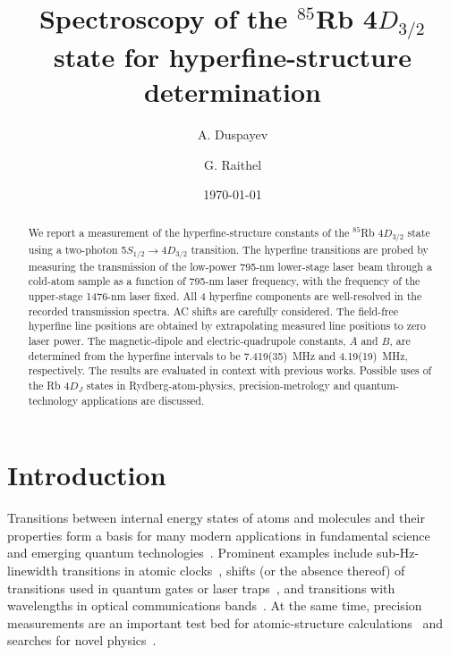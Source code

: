 \documentclass[reprint, amsmath,amssymb, aps, pra, longbibliography]{revtex4-1}
\begin{document}
\title{Spectroscopy of the $^{85}$Rb 4$D_{3/2}$ state for hyperfine-structure determination}
\date{\today }

\author{A. Duspayev}
\author{G. Raithel}


\begin{abstract}
We report a measurement of the hyperfine-structure constants of the $^{85}$Rb 4$D_{3/2}$ state using a two-photon 5$S_{1/2}\rightarrow$4$D_{3/2}$ transition. The hyperfine transitions are probed by measuring the transmission of the low-power 795-nm lower-stage laser beam through a cold-atom sample as a function of 795-nm laser frequency, with the frequency of the upper-stage 1476-nm laser fixed. All 4 hyperfine components are well-resolved in the recorded transmission spectra. AC shifts are carefully considered. The field-free hyperfine line positions are obtained by extrapolating measured line positions to zero laser power. 
The magnetic-dipole and electric-quadrupole constants, $A$ and $B$, are determined from the hyperfine intervals to be 7.419(35)~MHz and 4.19(19)~MHz, respectively.
The results are evaluated in context with previous works. Possible uses of the Rb 4$D_J$ states in Rydberg-atom-physics, precision-metrology and quantum-technology applications are discussed.   
\end{abstract}



\maketitle


\section{Introduction}
\label{sec:intro}
Transitions between internal energy states of atoms and molecules and their properties form a basis for many modern applications in fundamental science~\cite{safronovarmp} and emerging quantum technologies~\cite{macfarlane, Adams_2020, weiss2017}. Prominent examples include sub-Hz-linewidth transitions in atomic clocks~\cite{bloom2014}, shifts (or the absence thereof) of transitions used in quantum gates or laser traps~\cite{SafronovaRbMagic, Lundblad2010, zhangpra2011, sahoo2013}, and transitions with wavelengths in optical communications bands~\cite{chanliere2006, Cao_2019, Menon_2020}. At the same time, precision measurements are an important test bed for atomic-structure calculations~\cite{SAFRONOVA2008191, allegrini} and searches for novel physics~\cite{safronovarmp}.
\end{document}
